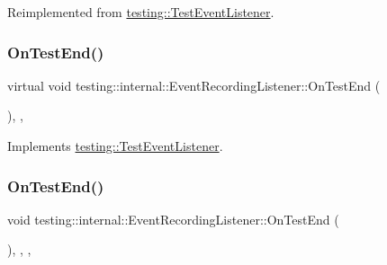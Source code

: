 Reimplemented from \mbox{\hyperlink{classtesting_1_1_test_event_listener_ac48628c9f78d3e10bff77c7366e9e780}{testing\+::\+Test\+Event\+Listener}}.

\mbox{\label{classtesting_1_1internal_1_1_event_recording_listener_adb076f145cc20d9b27441b9c75da4b81}} 
\subsubsection{\texorpdfstring{OnTestEnd()}{OnTestEnd()}\hspace{0.1cm}{\footnotesize\ttfamily [1/3]}}
{\footnotesize\ttfamily virtual void testing\+::internal\+::\+Event\+Recording\+Listener\+::\+On\+Test\+End (\begin{DoxyParamCaption}\item[{const \mbox{\hyperlink{classtesting_1_1_test_info}{Test\+Info}} \&}]{ }\end{DoxyParamCaption})\hspace{0.3cm}{\ttfamily [inline]}, {\ttfamily [protected]}, {\ttfamily [virtual]}}



Implements \mbox{\hyperlink{classtesting_1_1_test_event_listener_abb1c44525ef038500608b5dc2f17099b}{testing\+::\+Test\+Event\+Listener}}.

\mbox{\label{classtesting_1_1internal_1_1_event_recording_listener_ab374bf69a73cd7dd8fcef5aea1209728}} 
\subsubsection{\texorpdfstring{OnTestEnd()}{OnTestEnd()}\hspace{0.1cm}{\footnotesize\ttfamily [2/3]}}
{\footnotesize\ttfamily void testing\+::internal\+::\+Event\+Recording\+Listener\+::\+On\+Test\+End (\begin{DoxyParamCaption}\item[{const \mbox{\hyperlink{classtesting_1_1_test_info}{Test\+Info}} \&}]{ }\end{DoxyParamCaption})\hspace{0.3cm}{\ttfamily [inline]}, {\ttfamily [override]}, {\ttfamily [protected]}, {\ttfamily [virtual]}}




